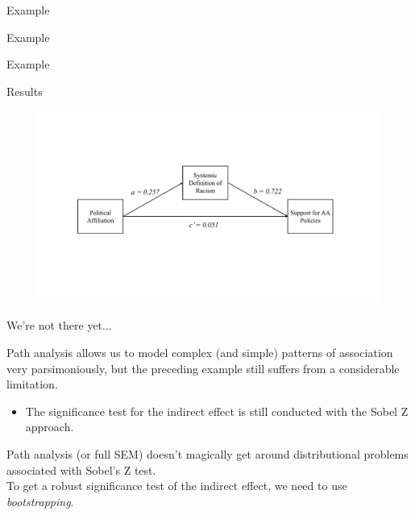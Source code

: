 \documentclass{beamer}
\newcommand{\va}[0]{\vspace{12pt}}
\begin{document}
\begin{frame}[allowframebreaks]{Example}



\end{frame}



\begin{frame}[allowframebreaks]{Example}



\end{frame}



\begin{frame}[shrink = 15]{Example}
  


\end{frame}



\begin{frame}{Results}
  
  \begin{figure}
    \begin{center}
      \includegraphics[width = \textwidth]{figures/adamsKlpsExample1PathDiagramWithValues.pdf}
    \end{center}
  \end{figure}
  
\end{frame}



\begin{frame}{We're not there yet...}
  
  Path analysis allows us to model complex (and simple) patterns of
  association very parsimoniously, but the preceding example still
  suffers from a considerable limitation.
  \pause
  \va
  \begin{itemize}
  \item The significance test for the indirect effect is still
    conducted with the Sobel Z approach.
  \end{itemize}
  \va
  Path analysis (or full SEM) doesn't magically get around
  distributional problems associated with Sobel's Z test.\\ 
  \va 
  To get a robust significance test of the indirect effect, 
  we need to use \emph{bootstrapping}.
  
\end{frame}
\end{document}
